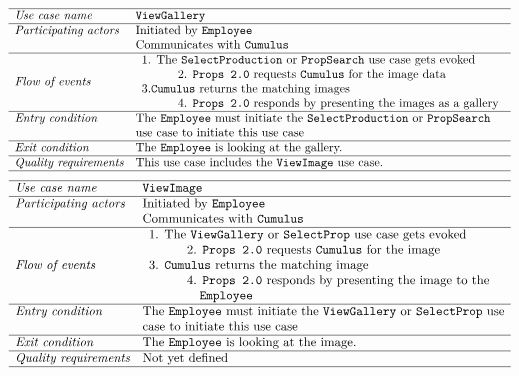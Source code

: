 \documentclass[12pt]{article}
\begin{document}
\[
\begin{array}{ll}
\hline
\textit{Use case name} & \texttt{ViewGallery} \\
\hline
\textit{Participating actors} & \text{Initiated by \texttt{Employee}}\\ &
\text{Communicates with \texttt{Cumulus}}\\
\hline
\textit{Flow of events} & 
\begin{array}{l}
\text{1. The \texttt{SelectProduction} or \texttt{PropSearch} use case gets evoked}\\
\quad \quad \quad \text{2. \texttt{Props 2.0} requests \texttt{Cumulus} for the image data}\\
3.\text{\texttt{Cumulus} returns the matching images}\\
\quad \quad \quad \text{4. \texttt{Props 2.0} responds by presenting the images as a gallery}
\end{array} \\
\hline
\textit{Entry condition} &
\text{The \texttt{Employee} must initiate the \texttt{SelectProduction} or \texttt{PropSearch}}\\ &
\text{use case to initiate this use case}\\
\hline
\textit{Exit condition} & \text{The \texttt{Employee} is looking at the gallery.} \\
\hline
\textit{Quality requirements} & \text{This use case includes the \texttt{ViewImage} use case.} \\
\hline
\end{array}
\]
\[
\begin{array}{ll}
\hline
\textit{Use case name} & \texttt{ViewImage} \\
\hline
\textit{Participating actors} & \text{Initiated by \texttt{Employee}}\\ &
\text{Communicates with \texttt{Cumulus}}\\
\hline
\textit{Flow of events} & 
\begin{array}{l}
\text{1. The \texttt{ViewGallery} or \texttt{SelectProp} use case gets evoked}\\
\quad \quad \quad \text{2. \texttt{Props 2.0} requests \texttt{Cumulus} for the image}\\
\text{3. \texttt{Cumulus} returns the matching image}\\
\quad \quad \quad \text{4. \texttt{Props 2.0} responds by presenting the image to the}\\ \quad \quad \quad \quad\texttt{Employee}
\end{array} \\
\hline
\textit{Entry condition} &
\text{The \texttt{Employee} must initiate the \texttt{ViewGallery} or \texttt{SelectProp} use}\\ &
\text{case to initiate this use case}\\
\hline
\textit{Exit condition} & \text{The \texttt{Employee} is looking at the image.} \\
\hline
\textit{Quality requirements} & \text{Not yet defined} \\
\hline
\end{array}
\]
\end{document}
